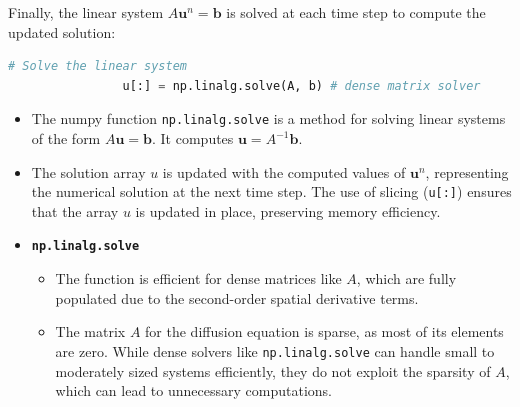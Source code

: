 \documentclass{article}
\begin{document}
			Finally, the linear system \( A \mathbf{u}^{n} = \mathbf{b} \) is solved at each time step to compute the updated solution:
			
			\begin{lstlisting}[language=Python]
				# Solve the linear system
				u[:] = np.linalg.solve(A, b) # dense matrix solver
			\end{lstlisting}
			
				\begin{itemize}
				\item The numpy function \texttt{np.linalg.solve} is a method for solving linear systems of the form \( A \mathbf{u} = \mathbf{b} \). It computes \( \mathbf{u} = A^{-1} \mathbf{b} \).
				
				\item The solution array \( u \) is updated with the computed values of \( \mathbf{u}^{n} \), representing the numerical solution at the next time step. The use of slicing (\texttt{u[:]}) ensures that the array \( u \) is updated in place, preserving memory efficiency.
				
				\item \textbf{\texttt{np.linalg.solve}}
					\begin{itemize}
						\item The function is efficient for dense matrices like \( A \), which are fully populated due to the second-order spatial derivative terms.
						\item The matrix \( A \) for the diffusion equation is sparse, as most of its elements are zero. While dense solvers like \texttt{np.linalg.solve} can handle small to moderately sized systems efficiently, they do not exploit the sparsity of \( A \), which can lead to unnecessary computations.
						
					\end{itemize}
				\end{itemize}
				
\end{document}
